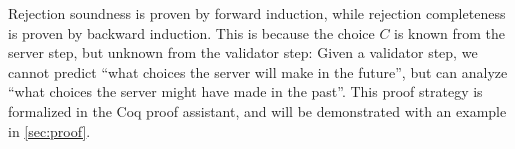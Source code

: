 Rejection soundness is proven by forward induction, while rejection completeness
is proven by backward induction.  This is because the choice $C$ is known from
the server step, but unknown from the validator step: Given a validator step, we
cannot predict ``what choices the server will make in the future'', but can
analyze ``what choices the server might have made in the past''.  This proof
strategy is formalized in the Coq proof assistant, and will be demonstrated with
an example in \autoref{sec:proof}.
